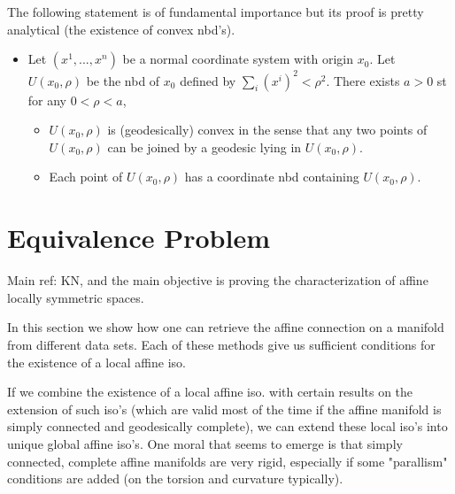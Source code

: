 \documentclass{report}
\theoremstyle{definition}
\begin{document}
The following statement is of fundamental importance but its proof is pretty analytical (the existence of convex nbd's).
\begin{itemize}
    \item Let $(x^1,...,x^n)$ be a normal coordinate system with origin $x_0$. Let $U(x_0,\rho)$ be the nbd of $x_0$ defined by $\sum_i (x^i)^2<\rho^2$. There exists $a>0$ st for any $0<\rho<a$,
    \begin{itemize}
        \item $U(x_0,\rho)$ is (geodesically) convex in the sense that any two points of $U(x_0,\rho)$ can be joined by a geodesic lying in $U(x_0,\rho)$.
        \item Each point of $U(x_0,\rho)$ has a coordinate nbd containing $U(x_0,\rho)$.
    \end{itemize}
\end{itemize}

\section{Equivalence Problem}

Main ref: KN, and the main objective is proving the characterization of affine locally symmetric spaces.

In this section we show how one can retrieve the affine connection on a manifold from different data sets. Each of these methods give us sufficient conditions for the existence of a local affine iso. 

If we combine the existence of a local affine iso. with certain results on the extension of such iso's (which are valid most of the time if the affine manifold is simply connected and geodesically complete), we can extend these local iso's into unique global affine iso's. One moral that seems to emerge is that simply connected, complete affine manifolds are very rigid, especially if some "parallism" conditions are added (on the torsion and curvature typically).
\end{document}
